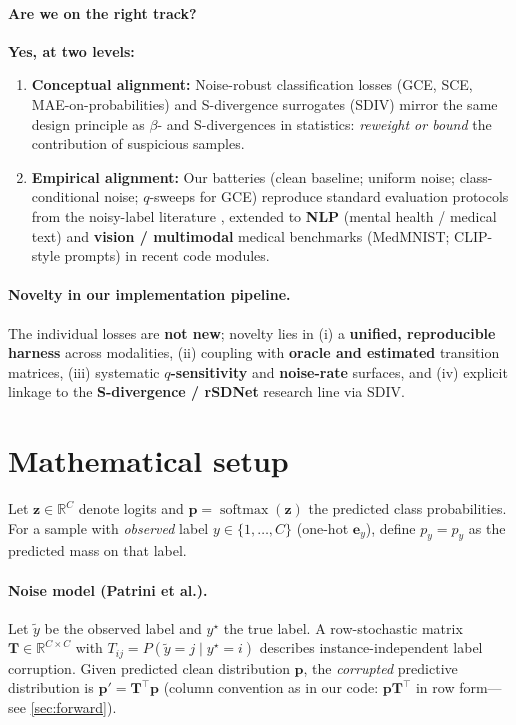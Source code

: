 \documentclass[11pt,a4paper]{article}
\newcommand{\softmax}{\operatorname{softmax}}
\begin{document}
\paragraph{Are we on the right track?}
\textbf{Yes, at two levels:}
\begin{enumerate}[leftmargin=*]
  \item \textbf{Conceptual alignment:} Noise-robust classification losses (GCE, SCE, MAE-on-probabilities) and S-divergence surrogates (SDIV) mirror the same design principle as $\beta$- and S-divergences in statistics: \emph{reweight or bound} the contribution of suspicious samples.
  \item \textbf{Empirical alignment:} Our batteries (clean baseline; uniform noise; class-conditional noise; $q$-sweeps for GCE) reproduce standard evaluation protocols from the noisy-label literature \cite{zhang2018gce,wang2019sce,patrini2017}, extended to \textbf{NLP} (mental health / medical text) and \textbf{vision / multimodal} medical benchmarks (MedMNIST; CLIP-style prompts) in recent code modules.
\end{enumerate}

\paragraph{Novelty in our implementation pipeline.}
The individual losses are \textbf{not new}; novelty lies in (i) a \textbf{unified, reproducible harness} across modalities, (ii) coupling with \textbf{oracle and estimated} transition matrices, (iii) systematic \textbf{$q$-sensitivity} and \textbf{noise-rate} surfaces, and (iv) explicit linkage to the \textbf{S-divergence / rSDNet} research line via SDIV.

\section{Mathematical setup}

Let $\mathbf{z} \in \mathbb{R}^C$ denote logits and $\mathbf{p} = \softmax(\mathbf{z})$ the predicted class probabilities. For a sample with \emph{observed} label $y \in \{1,\ldots,C\}$ (one-hot $\mathbf{e}_y$), define $p_y = p_{y}$ as the predicted mass on that label.

\paragraph{Noise model (Patrini et al.).}
Let $\tilde{y}$ be the observed label and $y^\star$ the true label. A row-stochastic matrix $\mathbf{T} \in \mathbb{R}^{C \times C}$ with $T_{ij} = P(\tilde{y}=j \mid y^\star=i)$ describes instance-independent label corruption. Given predicted clean distribution $\mathbf{p}$, the \emph{corrupted} predictive distribution is $\mathbf{p}' = \mathbf{T}^\top \mathbf{p}$ (column convention as in our code: $\mathbf{p} \mathbf{T}^\top$ in row form---see \cref{sec:forward}).
\end{document}
